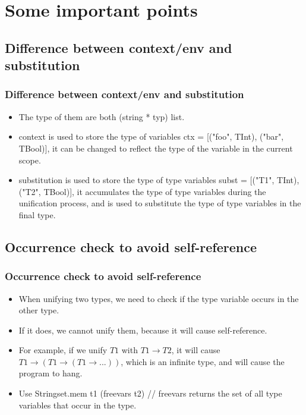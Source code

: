 \documentclass[t]{beamer}
\begin{document}
    \section{Some important points}
    \subsection{Difference between context/env and substitution}
    \begin{frame}
        \frametitle{Difference between context/env and substitution}
        \begin{itemize}
            \item The type of them are both {\ttfamily (string * typ) list}.
            \item context is used to store the type of variables {\ttfamily ctx = [("foo", TInt), ("bar", TBool)]}, 
            it can be changed to reflect the type of the variable in the current scope. 
            \item substitution is used to store the type of type variables {\ttfamily subst = [("T1", TInt), ("T2", TBool)]}, 
            it accumulates the type of type variables during the unification process, and is used to substitute the type of type variables in the final type.
        \end{itemize}
    \end{frame}

    \subsection{Occurrence check to avoid self-reference}
    \begin{frame}
        \frametitle{Occurrence check to avoid self-reference}
        \begin{itemize}
            \item When unifying two types, we need to check if the type variable occurs in the other type.
            \item If it does, we cannot unify them, because it will cause self-reference.
            \item For example, if we unify $T1$ with $T1 \rightarrow T2$, it will cause $T1 \rightarrow (T1 \rightarrow (T1 \rightarrow ...))$, 
            which is an infinite type, and will cause the program to hang.
            \item Use {\ttfamily Stringset.mem t1 (freevars t2)} // freevars returns the set of all type variables that occur in the type.
        \end{itemize}
    \end{frame}

\end{document}
